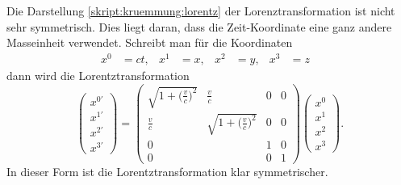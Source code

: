 Die Darstellung \eqref{skript:kruemmung:lorentz} der Lorenztransformation
ist nicht sehr symmetrisch.
Dies liegt daran, dass die Zeit-Koordinate eine ganz andere Masseinheit
verwendet.
Schreibt man für die Koordinaten 
\[
\begin{aligned}
x^0&=ct,&
x^1&=x,&
x^2&=y,&
x^3&=z&
\end{aligned}
\]
dann wird die Lorentztransformation
\begin{equation}
\begin{pmatrix}
x^{0\prime}\\
x^{1\prime}\\
x^{2\prime}\\
x^{3\prime}
\end{pmatrix}
=
\begin{pmatrix}
\sqrt{1+\biggl(\displaystyle\frac{v}{c}\biggr)^2} & \displaystyle\frac{v}{c} & 0 & 0 \\
\displaystyle\frac{v}{c} & \sqrt{1+\biggl(\displaystyle\frac{v}{c}\biggr)^2} & 0 & 0 \\
      0     &                                      & 1 & 0 \\
      0     &                                      & 0 & 1 
\end{pmatrix}
\begin{pmatrix}
x^0\\x^1\\x^2\\x^3
\end{pmatrix}.
\label{skript:speziell:4lorentz}
\end{equation}
In dieser Form ist die Lorentztransformation klar symmetrischer.

